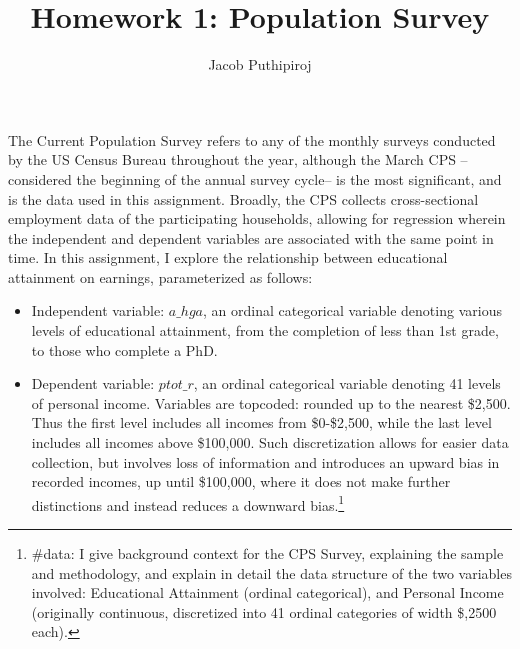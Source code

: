 \documentclass{article}
\begin{document}
\title{Homework 1: Population Survey}
\author{Jacob Puthipiroj}
\maketitle


The Current Population Survey refers to any of the monthly surveys conducted by the US Census Bureau throughout the year, although the March CPS --considered the beginning of the annual survey cycle-- is the most significant, and is the data used in this assignment. Broadly, the CPS collects cross-sectional employment data of the participating households, allowing for regression wherein the independent and dependent variables are associated with the same point in time. In this assignment, I explore the relationship between educational attainment on earnings, parameterized as follows:

\begin{itemize}
\item Independent variable: $a\_hga$, an ordinal categorical variable denoting various levels of educational attainment, from the completion of less than 1st grade, to those who complete a PhD.
\item Dependent variable: $ptot\_r$, an ordinal categorical variable denoting 41 levels of personal income. Variables are topcoded: rounded up to the nearest \$2,500. Thus the first level includes all incomes from \$0-\$2,500, while the last level includes all incomes above \$100,000. Such discretization allows for easier data collection, but involves loss of information and introduces an upward bias in recorded incomes, up until \$100,000, where it does not make further distinctions and instead reduces a downward bias.\footnote{\#data: I give background context for the CPS Survey, explaining the sample and methodology, and explain in detail the data structure of the two variables involved: Educational Attainment (ordinal categorical), and Personal Income (originally continuous, discretized into 41 ordinal categories of width \$,2500 each). }

\end{itemize}
\end{document}
